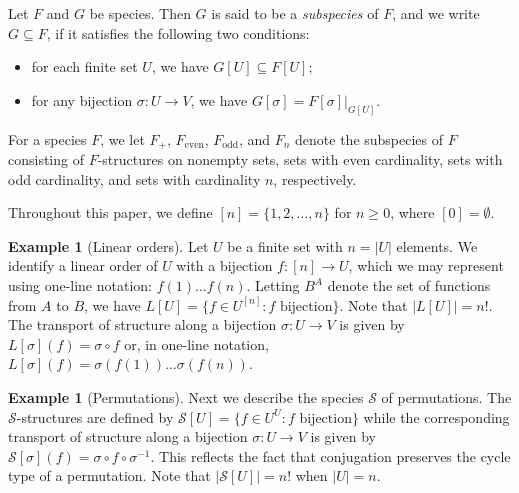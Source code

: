 \documentclass[a4paper, 11pt]{article}
\newcommand{\Sym}{\mathcal{S}}
\newcommand{\Even}[1]{#1_{\mathrm{even}}}
\newcommand{\Odd}[1]{#1_{\mathrm{odd}}}
\theoremstyle{definition}
\newtheorem{example}[theorem]{Example}
\begin{document}
Let $F$ and $G$ be species. Then $G$ is said to be a \emph{subspecies}
of $F$, and we write $G\subseteq F$, if it satisfies the following two
conditions:
\begin{itemize}
\item for each finite set $U$, we have $G[U]\subseteq F[U]$;
\item for any bijection $\sigma:U\to V$, we have $G[\sigma]=F[\sigma]|_{G[U]}$.
\end{itemize}

For a species $F$, we let $F_+$, $\Even{F}$, $\Odd{F}$, and $F_n$ denote 
the subspecies of $F$ consisting of $F$-structures on nonempty sets, 
sets with even cardinality, sets with odd cardinality, and sets 
with cardinality $n$, respectively.

Throughout this paper, we define $[n] = \{1,2,\ldots,n\}$ for $n\geq 0$, where $[0]=\emptyset$.

\begin{example}[Linear orders]\label{example of linear orders}
  Let $U$ be a finite set with $n = |U|$ elements. We identify a linear
  order of $U$ with a bijection $f: [n] \to U$, which we may represent
  using one-line notation: $f(1)\ldots f(n)$. Letting $B^A$ denote the set
  of functions from $A$ to $B$, we have
  $L[U] = \{ f\in U^{[n]} : f \text{ bijection}\}$. Note that
  $|L[U]|=n!$. The transport of structure along a bijection
  $\sigma:U \to V$ is given by $L[\sigma](f) = \sigma \circ f$ or, in
  one-line notation, $L[\sigma](f)= \sigma(f(1)) \ldots \sigma(f(n))$.
\end{example}

\begin{example}[Permutations]\label{example of permutations}
  Next we describe the species $\Sym$ of permutations.
  The $\Sym$-structures are defined by
  $\Sym[U] = \{f\in U^U: f \text{ bijection}\}$ while the
  corresponding transport of structure along a bijection $\sigma:U \to V$
  is given by $\Sym[\sigma](f) = \sigma \circ f \circ \sigma^{-1}$.
  This reflects the fact that
  conjugation preserves the cycle type of a permutation. Note that
  $|\Sym[U]|=n!$ when $|U|=n$.
\end{example}
\end{document}
